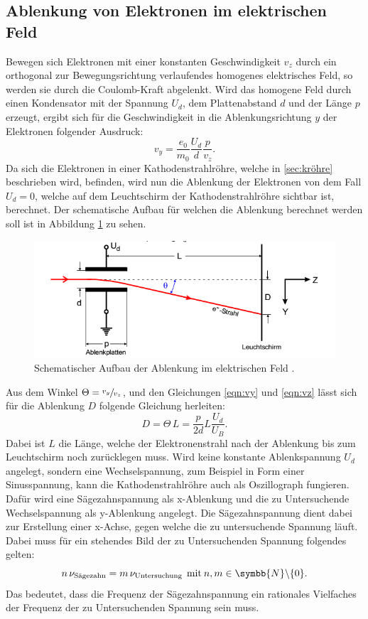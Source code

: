 \subsection{Ablenkung von Elektronen im elektrischen Feld}
\label{sec:efeld}
Bewegen sich Elektronen mit einer konstanten Geschwindigkeit $v_z$ durch ein orthogonal zur Bewegungsrichtung verlaufendes homogenes elektrisches Feld, so werden
sie durch die Coulomb-Kraft abgelenkt. Wird das homogene Feld durch einen Kondensator mit der Spannung $U_d$, dem Plattenabstand $d$ und der Länge
$p$ erzeugt, ergibt sich für die Geschwindigkeit in die Ablenkungsrichtung $y$ der Elektronen folgender Ausdruck:
\begin{equation}
  v_y = \frac{e_0}{m_0} \frac{U_d}{d} \frac{p}{v_z}.
  \label{eqn:vy}
\end{equation}
Da sich die Elektronen in einer Kathodenstrahlröhre, welche in \ref{sec:kröhre} beschrieben wird, befinden, wird nun die Ablenkung der Elektronen von
dem Fall $U_d = 0$, welche auf dem Leuchtschirm der Kathodenstrahlröhre sichtbar ist, berechnet.
Der schematische Aufbau für welchen die Ablenkung berechnet werden soll ist in Abbildung \ref{fig:efeld} zu sehen.
\begin{figure}
  \centering
  \includegraphics{images/efeld.png}
  \caption{Schematischer Aufbau der Ablenkung im elektrischen Feld \cite{501}.}
  \label{fig:efeld}
\end{figure}
Aus dem Winkel $\Theta = \sfrac{v_y}{v_z}$, und den Gleichungen \eqref{eqn:vy} und \eqref{eqn:vz} lässt sich
für die Ablenkung $D$ folgende Gleichung herleiten:
\begin{equation}
  D = \Theta \, L =  \frac{p}{2d} L \frac{U_d}{U_B}.
  \label{eqn:AblenkungEFeld}
\end{equation}
Dabei ist $L$ die Länge, welche der Elektronenstrahl nach der Ablenkung bis zum Leuchtschirm noch zurücklegen muss.
Wird keine konstante Ablenkspannung $U_d$ angelegt, sondern eine Wechselspannung, zum Beispiel in Form einer Sinusspannung, kann die Kathodenstrahlröhre auch
als Oszillograph fungieren. Dafür wird eine Sägezahnspannung als x-Ablenkung und die zu Untersuchende Wechselspannung als y-Ablenkung angelegt. Die Sägezahnspannung
dient dabei zur Erstellung einer x-Achse, gegen welche die zu untersuchende Spannung läuft. Dabei muss für ein stehendes Bild der zu Untersuchenden Spannung folgendes gelten:
\begin{equation}
  n \, {\nu}_\text{Sägezahn} = m \, {\nu}_\text{Untersuchung} \: \: \text{mit} \: n,m \in \symbb{N} \backslash \{0\} .
  \label{eqn:Oszillograph}
\end{equation}
Das bedeutet, dass die Frequenz der Sägezahnspannung ein rationales Vielfaches der Frequenz der zu Untersuchenden Spannung sein muss.

